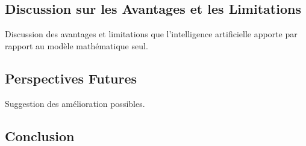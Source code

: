 \subsection{Discussion sur les Avantages et les Limitations}

Discussion des avantages et limitations que l'intelligence artificielle apporte par rapport au modèle mathématique seul.
\subsection{Perspectives Futures}
Suggestion des amélioration possibles.

\subsection{Conclusion}